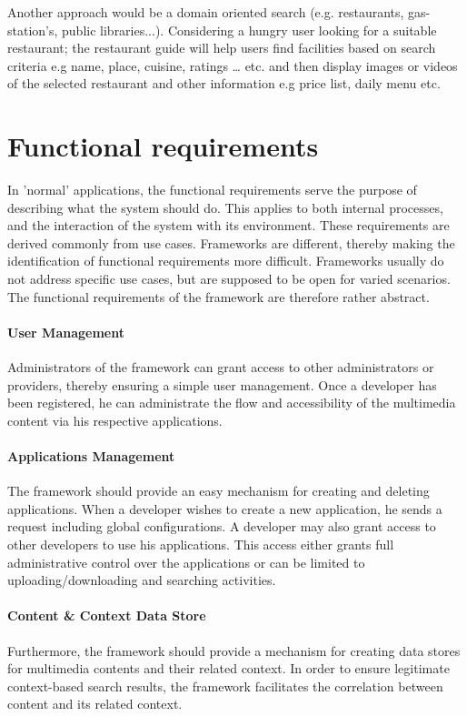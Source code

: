 Another approach would be a domain oriented search (e.g. restaurants, gas-station's, public libraries...). Considering a hungry user looking for a suitable restaurant; the restaurant guide will help users find facilities based on search criteria e.g name, place, cuisine, ratings … etc. and then display images or videos of the selected restaurant and other information e.g price list, daily menu etc.

\section{Functional requirements\label{sec:req_f_req}}

In 'normal' applications, the functional requirements serve the purpose of describing what the system should do. This applies to both internal processes, and the interaction of the system with its environment. These requirements are derived commonly from use cases. Frameworks are different, thereby making the identification of functional requirements more difficult. Frameworks usually do not address specific use cases, but are supposed to be open for varied scenarios. The functional requirements of the framework are therefore rather abstract.

\paragraph{User Management}
Administrators of the framework can grant access to other administrators or providers, thereby ensuring a simple user management. Once a developer has been registered, he can administrate the flow and accessibility of the multimedia content via his respective applications.

\paragraph{Applications Management}
The framework should provide an easy mechanism for creating and deleting applications. When a developer wishes to create a new application, he sends a request including global configurations. A developer may also grant access to other developers to use his applications. This access either grants full administrative control over the applications or can be limited to uploading/downloading and searching activities. 

\paragraph{Content \& Context Data Store}
Furthermore, the framework should provide a mechanism for creating data stores for multimedia contents and their related context. In order to ensure legitimate context-based search results, the framework facilitates the correlation between content and its related context. 

